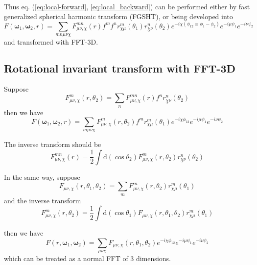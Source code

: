 Thus eq. (\ref{eq:local-forward}, \ref{eq:local_backward}) can be
performed either by fast generalized spherical harmonic transform
(\acs{FGSHT}), or being developed into
\begin{equation}
F(\boldsymbol{\omega}_{1},\boldsymbol{\omega}_{2},r)=\sum_{mn\mu\nu\chi}F_{\mu\nu,\chi}^{mn}(r)f^{m}f^{n}r_{\chi\mu}^{m}(\theta_{1})r_{\underline{\chi}\nu}^{n}(\theta_{2})e^{-i\chi(\phi_{12}\equiv\phi_{1}-\phi_{2})}e^{-i\mu\psi_{1}}e^{-i\nu\psi_{2}}\label{eq:eq_s1_local}
\end{equation}
and transformed with \acs{FFT}-3D.

\subsection*{Rotational invariant transform with FFT-3D}

Suppose
\begin{equation}
F_{\mu\nu,\chi}^{m}(r,\theta_{2})=\sum_{n}F_{\mu\nu,\chi}^{mn}(r)f^{n}r_{\underline{\chi}\nu}^{n}(\theta_{2})
\end{equation}
then we have
\begin{equation}
F(\boldsymbol{\omega}_{1},\boldsymbol{\omega}_{2},r)=\sum_{m\mu\nu\chi}F_{\mu\nu,\chi}^{m}(r,\theta_{2})f^{m}r_{\chi\mu}^{m}(\theta_{1})e^{-i\chi\phi_{12}}e^{-i\mu\psi_{1}}e^{-i\nu\psi_{2}}
\end{equation}

The inverse transform should be
\begin{equation}
F_{\mu\nu,\chi}^{mn}(r)=\frac{1}{2}\int\mathrm{d}(\cos\theta_{2})F_{\mu\nu,\chi}^{m}(r,\theta_{2})r_{\underline{\chi}\nu}^{n}(\theta_{2})
\end{equation}

In the same way, suppose
\begin{equation}
F_{\mu\nu,\chi}(r,\theta_{1},\theta_{2})=\sum_{m}F_{\mu\nu,\chi}^{m}(r,\theta_{2})r_{\chi\mu}^{m}(\theta_{1})
\end{equation}
and the inverse transform
\begin{equation}
F_{\mu\nu,\chi}^{m}(r,\theta_{2})=\frac{1}{2}\int\mathrm{d}(\cos\theta_{1})F_{\mu\nu,\chi}(r,\theta_{1},\theta_{2})r_{\chi\mu}^{m}(\theta_{1})
\end{equation}

then we have
\begin{equation}
F(r,\boldsymbol{\omega}_{1},\boldsymbol{\omega}_{2})=\sum_{\mu\nu\chi}F_{\mu\nu,\chi}(r,\theta_{1},\theta_{2})e^{-i\chi\phi_{12}}e^{-i\mu\psi_{1}}e^{-i\nu\psi_{2}}\label{eq:eq_s3_local}
\end{equation}
which can be treated as a normal \acs{FFT} of 3 dimensions.

